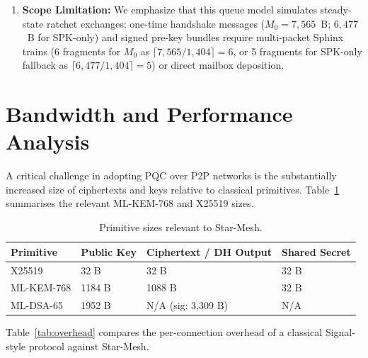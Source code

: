 \documentclass[11pt,a4paper]{article}
\theoremstyle{remark}
\theoremstyle{plain}
\begin{document}
\begin{enumerate}
        in operational mixnet deployments, mix nodes process thousands of packets per second, and per-hop Poisson
        delays are calibrated to physical milliseconds.
        Under churn ($10\%$--$30\%$), delivery rate degrades proportionally to route interruption,
        highlighting that transport-layer reliability requires end-to-end ACKs and retransmissions.
  \item \textbf{Scope Limitation:} We emphasize that this queue model simulates steady-state ratchet
        exchanges; one-time handshake messages ($M_0 = 7{,}565$~B; $6{,}477$~B for SPK-only) and signed pre-key bundles
        require multi-packet Sphinx trains (6 fragments for $M_0$ as $\lceil 7{,}565 / 1{,}404 \rceil = 6$, or 5 fragments for SPK-only fallback as $\lceil 6{,}477 / 1{,}404 \rceil = 5$) or direct mailbox deposition.
\end{enumerate}

\section{Bandwidth and Performance Analysis}
\label{sec:performance}

A critical challenge in adopting PQC over P2P networks is the substantially increased size of
ciphertexts and keys relative to classical primitives.  Table~\ref{tab:primitives} summarises
the relevant ML-KEM-768 and X25519 sizes.

\begin{table}[ht]
\centering
\caption{Primitive sizes relevant to Star-Mesh.}
\label{tab:primitives}
\begin{tabular}{@{}llll@{}}
\toprule
\textbf{Primitive} & \textbf{Public Key} & \textbf{Ciphertext / DH Output} & \textbf{Shared Secret} \\
\midrule
X25519    & 32 B    & 32 B              & 32 B \\
ML-KEM-768 & 1184 B & 1088 B            & 32 B \\
ML-DSA-65 & 1952 B  & N/A (sig: 3{,}309 B) & N/A  \\
\bottomrule
\end{tabular}
\end{table}

Table~\ref{tab:overhead} compares the per-connection overhead of a classical Signal-style
protocol against Star-Mesh.
\end{document}
